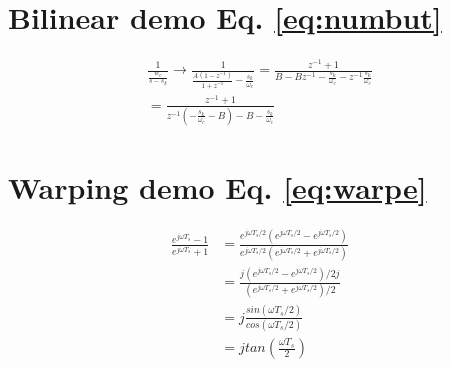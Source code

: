 \documentclass[twoside,twocolumn]{article}
\begin{document}
\newpage
\appendix

\section{Bilinear demo Eq. \ref{eq:numbut}}
\begin{equation*}
\begin{split}
\frac{1}{\frac{w_c}{s-s_k}}
\rightarrow\frac{1}{\frac{A(1-z^{-1})}{1+z^{-1}}-\frac{s_k}{\omega_c}} 
=\frac{z^{-1}+1}{B-Bz^{-1}-\frac{s_k}{\omega_c}-z^{-1}\frac{s_k}{\omega_c}}\\
=\frac{z^{-1}+1}{z^{-1}(-\frac{s_k}{\omega_c}-B)-B-\frac{s_k}{\omega_c}}
\end{split}
\end{equation*}
\section{Warping demo Eq. \ref{eq:warpe}}
\begin{equation*}
\begin{split}
\frac{e^{j\omega T_s}-1}{e^{j\omega T_s}+1} &= \frac{e^{j\omega T_s/2}(e^{j\omega T_s/2}-e^{j\omega T_s/2})}{e^{j\omega T_s/2}(e^{j\omega T_s/2}+e^{j\omega T_s/2})}\\
& = \frac{j(e^{j\omega T_s/2}-e^{j\omega T_s/2})/2j}{(e^{j\omega T_s/2}+e^{j\omega T_s/2})/2}\\
&  =j \frac{sin(\omega T_s/2)}{cos(\omega T_s/2)}\\
& = jtan(\frac{\omega  T_s}{2})
\end{split}
\end{equation*}

\end{document}
